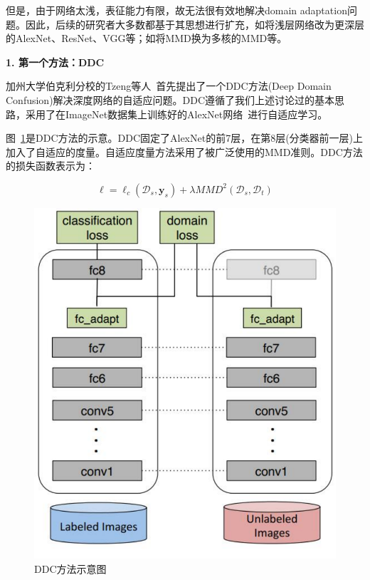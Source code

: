 但是，由于网络太浅，表征能力有限，故无法很有效地解决domain adaptation问题。因此，后续的研究者大多数都基于其思想进行扩充，如将浅层网络改为更深层的AlexNet、ResNet、VGG等；如将MMD换为多核的MMD等。

\textbf{1. 第一个方法：DDC}

加州大学伯克利分校的Tzeng等人~\cite{tzeng2014deep}首先提出了一个DDC方法(Deep Domain Confusion)解决深度网络的自适应问题。DDC遵循了我们上述讨论过的基本思路，采用了在ImageNet数据集上训练好的AlexNet网络~\cite{krizhevsky2012imagenet}进行自适应学习。

图~\ref{fig-deep-ddc}是DDC方法的示意。DDC固定了AlexNet的前7层，在第8层(分类器前一层)上加入了自适应的度量。自适应度量方法采用了被广泛使用的MMD准则。DDC方法的损失函数表示为：

\begin{equation}
	\label{eq-deep-ddc}
	\ell = \ell_c(\mathcal{D}_s,\mathbf{y}_s) + \lambda MMD^2(\mathcal{D}_s,\mathcal{D}_t)
\end{equation}

\begin{figure}[htbp]
	\centering
	\includegraphics[scale=0.6]{./figures/fig-deep-ddc.pdf}
	\caption{DDC方法示意图}
	\label{fig-deep-ddc}
\end{figure}

